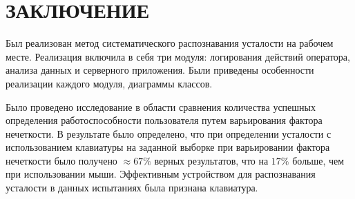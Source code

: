 \section*{ЗАКЛЮЧЕНИЕ}

Был реализован метод систематического распознавания усталости на рабочем месте. Реализация включила в себя три модуля: логирования действий оператора, анализа данных и серверного приложения. Были приведены особенности реализации каждого модуля, диаграммы классов.

Было проведено исследование в области сравнения количества ус\-пешных определения работоспособности пользователя путем варьирования \newline фактора нечеткости. В результате было определено, что при определении усталости с использованием клавиатуры на заданной выборке при варьировании фактора нечеткости было получено $\approx 67\%$ верных результатов, что на $17\%$ больше, чем при использовании мыши. Эффективным устройством для распознавания усталости в данных испытаниях была признана клавиатура.

\pagebreak